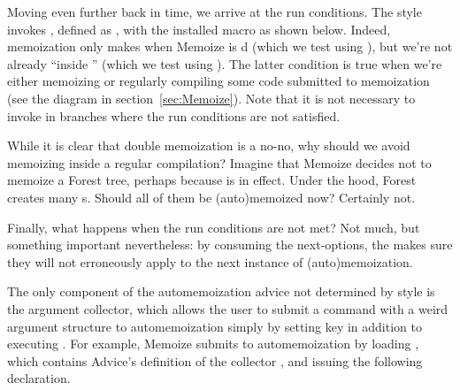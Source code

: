 \documentclass[a4paper,11pt]{article}
\begin{document}

Moving even further back in time, we arrive at the run conditions.  The
 style invokes ,
defined as , with
the installed macro as shown below.  Indeed, memoization only makes when
Memoize is d (which we test using ), but we're
not already ``inside '' (which we test using
).  The latter condition is true when we're either
memoizing or regularly compiling some code submitted to memoization (see the
diagram in section~\ref{sec:Memoize}).  Note that it is not necessary to invoke
 in branches where the run conditions are not satisfied.


While it is clear that double memoization is a no-no, why should we avoid
memoizing inside a regular compilation?  Imagine that Memoize decides not to
memoize a Forest tree, perhaps because  is in effect.  Under
the hood, Forest creates many s.  Should all of them be
(auto)memoized now? Certainly not.

Finally, what happens when the run conditions are not met?  Not much, but
something important nevertheless: by consuming the next-options, the
 makes sure they will not erroneously apply to the
next instance of (auto)memoization.


The only component of the automemoization advice not determined by style
 is the argument collector, which allows the user to submit
a command with a weird argument structure to automemoization simply by setting
key  in addition to executing .  For
example, Memoize submits  to automemoization by loading
, which contains Advice's definition of the
 collector , and issuing the
following declaration.
\end{document}
